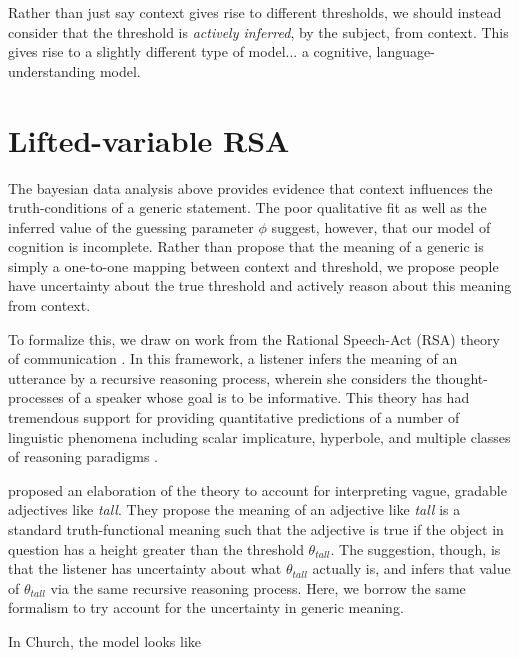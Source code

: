 \documentclass[10pt,letterpaper]{article}
\begin{document}
Rather than just say context gives rise to different thresholds, we should instead consider that the threshold is \emph{actively inferred}, by the subject, from context. This gives rise to a slightly different type of model... a cognitive, language-understanding model.


\section{Lifted-variable RSA}

The bayesian data analysis above provides evidence that context influences the truth-conditions of a generic statement. The poor qualitative fit as well as the inferred value of the guessing parameter $\phi$ suggest, however, that our model of cognition is incomplete. Rather than propose that the meaning of a generic is simply a one-to-one mapping between context and threshold, we propose people have uncertainty about the true threshold and actively reason about this meaning from context. 

To formalize this, we draw on work from the Rational Speech-Act (RSA) theory of communication \cite{Frank2012}. In this framework, a listener infers the meaning of an utterance by a recursive reasoning process, wherein she considers the thought-processes of a speaker whose goal is to be informative. This theory has had tremendous support for providing quantitative predictions of a number of linguistic phenomena including scalar implicature, hyperbole, and multiple classes of reasoning paradigms \cite{Goodman2013, Kao2014, Tessler2014, Lassiter2014}. 

 proposed an elaboration of the theory to account for interpreting vague, gradable adjectives like \emph{tall}. They propose the meaning of an adjective like \emph{tall} is a standard truth-functional meaning such that the adjective is true if the object in question has a height greater than the threshold $\theta_{tall}$. The suggestion, though, is that the listener has uncertainty about what $\theta_{tall}$ actually is, and infers that value of $\theta_{tall}$ via the same recursive reasoning process. Here, we borrow the same formalism to try account for the uncertainty in generic meaning.

In Church, the model looks like
\end{document}
